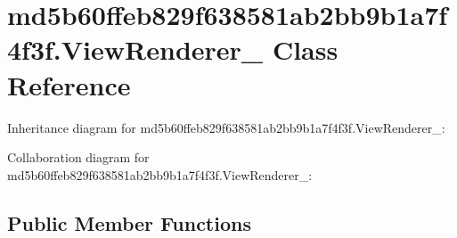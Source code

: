 \hypertarget{classmd5b60ffeb829f638581ab2bb9b1a7f4f3f_1_1_view_renderer__2}{}\section{md5b60ffeb829f638581ab2bb9b1a7f4f3f.\+View\+Renderer\+\_ Class Reference}
\label{classmd5b60ffeb829f638581ab2bb9b1a7f4f3f_1_1_view_renderer__2}


Inheritance diagram for md5b60ffeb829f638581ab2bb9b1a7f4f3f.\+View\+Renderer\+\_\+:


Collaboration diagram for md5b60ffeb829f638581ab2bb9b1a7f4f3f.\+View\+Renderer\+\_\+:
\subsection*{Public Member Functions}
